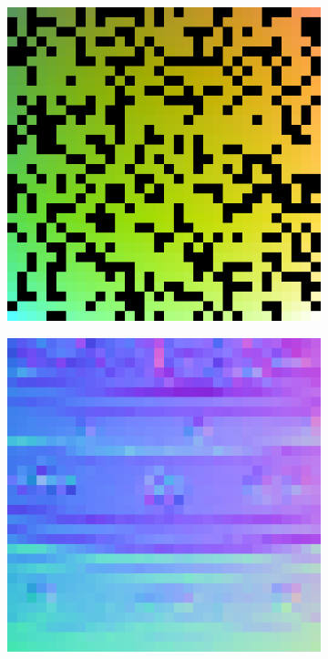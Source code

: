 \begin{figure}
	
	
	\begin{subfigure}[b]{0.24\linewidth}
		\includegraphics[width=\linewidth]{./Figures/gcnn_synthetic/eval_2_input.png}
	\end{subfigure}
	\begin{subfigure}[b]{0.24\linewidth}
		\includegraphics[width=\linewidth]{./Figures/gcnn_synthetic/eval_2_normal_GT.png}

\end{subfigure}
\end{figure}

